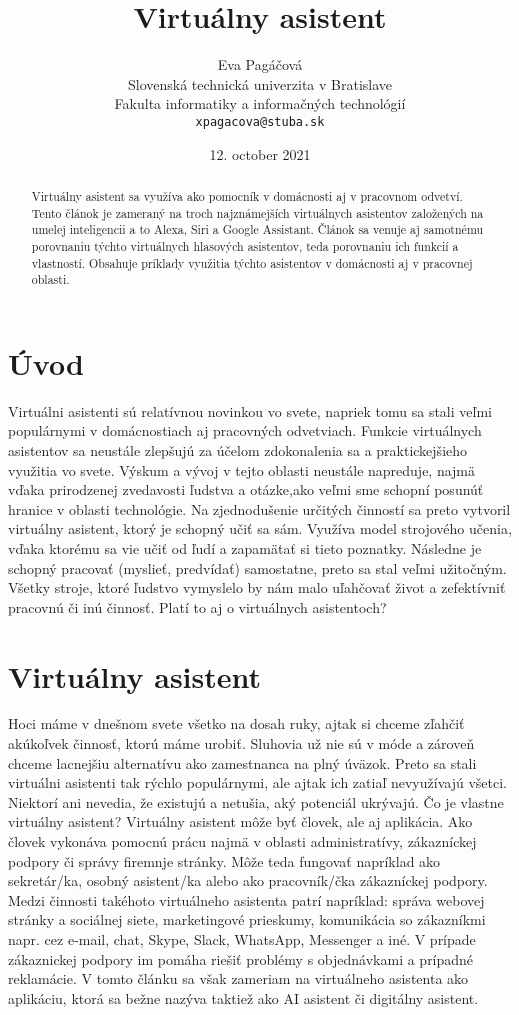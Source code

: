 \documentclass[10pt,twoside,slovak,coursepaper]{article}
\title{Virtuálny asistent}
\author{Eva Pagáčová\\[2pt]
	{\small Slovenská technická univerzita v Bratislave}\\
	{\small Fakulta informatiky a informačných technológií}\\
	{\small \texttt{xpagacova@stuba.sk}}
	}
\date{\small 12. october 2021}
\begin{document}
\maketitle

\begin{abstract}
 Virtuálny asistent sa využíva ako pomocník v domácnosti aj v pracovnom odvetví. Tento článok je zameraný na troch najznámejších virtuálnych asistentov založených na umelej inteligencii a to Alexa, Siri a Google Assistant. Článok sa venuje aj samotnému porovnaniu týchto virtuálnych hlasových asistentov, teda porovnaniu ich funkcií a vlastností. Obsahuje príklady využitia týchto asistentov v domácnosti aj v pracovnej oblasti.
\end{abstract}

\section{Úvod} \label{uvod}
Virtuálni asistenti sú relatívnou novinkou vo svete, napriek tomu sa stali veľmi populárnymi v domácnostiach aj pracovných odvetviach. Funkcie virtuálnych asistentov sa neustále zlepšujú za účelom zdokonalenia sa a praktickejšieho využitia vo svete. Výskum a vývoj v tejto oblasti neustále napreduje, najmä vďaka prirodzenej zvedavosti ľudstva a otázke,ako veľmi sme schopní posunúť hranice v oblasti technológie. Na zjednodušenie určitých činností sa preto vytvoril virtuálny asistent, ktorý je schopný učiť sa sám. Využíva model strojového učenia, vďaka ktorému sa vie učiť od ľudí a zapamätať si tieto poznatky. Následne je schopný pracovať (myslieť, predvídať) samostatne, preto sa stal veľmi užitočným. Všetky stroje, ktoré ľudstvo vymyslelo by nám malo uľahčovať život a zefektívniť pracovnú či inú činnosť. Platí to aj o virtuálnych asistentoch?

\section{Virtuálny asistent}
Hoci máme v dnešnom svete všetko na dosah ruky, ajtak si chceme zľahčiť akúkoľvek činnosť, ktorú máme urobiť. Sluhovia už nie sú v móde a zároveň chceme lacnejšiu alternatívu ako zamestnanca na plný úväzok. Preto sa stali virtuálni asistenti tak rýchlo populárnymi, ale ajtak ich zatiaľ nevyužívajú všetci. Niektorí ani nevedia, že existujú a netušia, aký potenciál ukrývajú. Čo je vlastne virtuálny asistent?
Virtuálny asistent môže byť človek, ale aj aplikácia. Ako človek vykonáva pomocnú prácu najmä v oblasti administratívy, zákazníckej podpory či správy firemnje stránky. Môže teda fungovať napríklad ako sekretár/ka, osobný asistent/ka alebo ako pracovník/čka zákazníckej podpory. Medzi činnosti takéhoto virtuálneho asistenta patrí napríklad: správa webovej stránky a sociálnej siete, marketingové prieskumy, komunikácia so zákazníkmi napr. cez e-mail, chat, Skype, Slack, WhatsApp, Messenger a iné. V prípade zákaznickej podpory im pomáha riešiť problémy s objednávkami a prípadné reklamácie.
V tomto článku sa však zameriam na virtuálneho asistenta ako aplikáciu, ktorá sa bežne nazýva taktiež ako AI asistent či digitálny asistent. 
\end{document}
